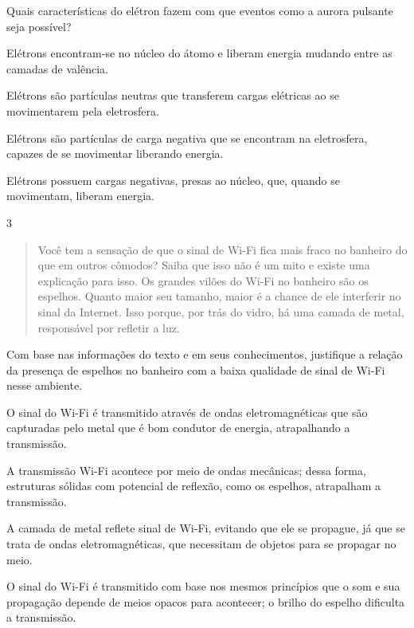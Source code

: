 Quais características do elétron fazem com que eventos como a aurora
pulsante seja possível?

\begin{escolha}
\item
  Elétrons encontram-se no núcleo do átomo e liberam energia mudando entre as camadas de valência.
\item
  Elétrons são partículas neutras que transferem cargas elétricas ao se movimentarem pela eletrosfera.
\item
  Elétrons são partículas de carga negativa que se encontram na eletrosfera, capazes de se movimentar liberando energia.
\item
  Elétrons possuem cargas negativas, presas ao núcleo, que, quando se movimentam, liberam energia.
\end{escolha}


\num{3}

\begin{quote}  
Você tem a sensação de que o sinal de Wi-Fi fica mais fraco no
banheiro do que em outros cômodos? Saiba que isso não é um mito e
existe uma explicação para isso. Os grandes vilões do Wi-Fi no
banheiro são os espelhos. Quanto maior seu tamanho, maior é a chance
de ele interferir no sinal da Internet. Isso porque, por trás do
vidro, há uma camada de metal, responsável por refletir a luz.

\end{quote}

Com base nas informações do texto e em seus conhecimentos, justifique a
relação da presença de espelhos no banheiro com a baixa qualidade de
sinal de Wi-Fi nesse ambiente.

\begin{escolha}
\item
  O sinal do Wi-Fi é transmitido através de ondas eletromagnéticas que
  são capturadas pelo metal que é bom condutor de energia, atrapalhando
  a transmissão.
\item
  A transmissão Wi-Fi acontece por meio de ondas mecânicas; dessa forma,
  estruturas sólidas com potencial de reflexão, como os espelhos,
  atrapalham a transmissão.
\item
  A camada de metal reflete sinal de Wi-Fi, evitando que ele se
  propague, já que se trata de ondas eletromagnéticas, que necessitam de
  objetos para se propagar no meio.
\item
  O sinal do Wi-Fi é transmitido com base nos mesmos princípios que o som
  e sua propagação depende de meios opacos para acontecer; o brilho do
  espelho dificulta a transmissão.
\end{escolha}


